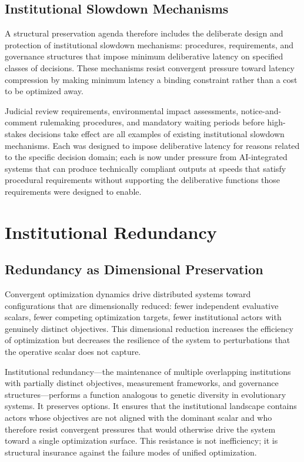 \documentclass[12pt, oneside]{book}
\theoremstyle{plain}
\theoremstyle{definition}
\theoremstyle{remark}
\theoremstyle{definition}
\begin{document}
\section{Institutional Slowdown Mechanisms}

A structural preservation agenda therefore includes the deliberate design and
protection of institutional slowdown mechanisms: procedures, requirements, and
governance structures that impose minimum deliberative latency on specified classes
of decisions. These mechanisms resist convergent pressure toward latency compression
by making minimum latency a binding constraint rather than a cost to be optimized
away.

Judicial review requirements, environmental impact assessments, notice-and-comment
rulemaking procedures, and mandatory waiting periods before high-stakes decisions
take effect are all examples of existing institutional slowdown mechanisms. Each was
designed to impose deliberative latency for reasons related to the specific decision
domain; each is now under pressure from AI-integrated systems that can produce
technically compliant outputs at speeds that satisfy procedural requirements without
supporting the deliberative functions those requirements were designed to enable.

\chapter{Institutional Redundancy}
\label{ch:redundancy}

\section{Redundancy as Dimensional Preservation}

Convergent optimization dynamics drive distributed systems toward configurations
that are dimensionally reduced: fewer independent evaluative scalars, fewer
competing optimization targets, fewer institutional actors with genuinely distinct
objectives. This dimensional reduction increases the efficiency of optimization but
decreases the resilience of the system to perturbations that the operative scalar
does not capture.

Institutional redundancy---the maintenance of multiple overlapping institutions
with partially distinct objectives, measurement frameworks, and governance
structures---performs a function analogous to genetic diversity in evolutionary
systems. It preserves options. It ensures that the institutional landscape contains
actors whose objectives are not aligned with the dominant scalar and who therefore
resist convergent pressures that would otherwise drive the system toward a single
optimization surface. This resistance is not inefficiency; it is structural
insurance against the failure modes of unified optimization.
\end{document}
